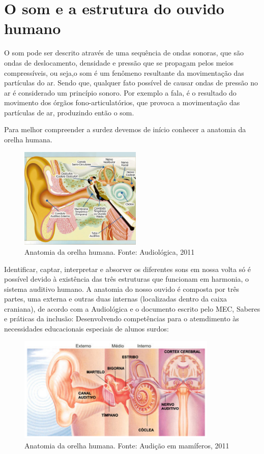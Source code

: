 \documentclass[brasil]{abnt}
\begin{document}
\chapter{O som e a estrutura do ouvido humano}
			O som pode ser descrito através de uma sequência de ondas sonoras, que são ondas de deslocamento, densidade e pressão que se propagam pelos meios compressíveis, ou seja,o som é um fenômeno resultante 
			da movimentação das partículas do ar. Sendo que, qualquer fato possível de causar ondas de pressão no ar é considerado um princípio sonoro.	Por exemplo a fala, é o resultado do movimento dos órgãos 
			fono-articulatórios, que provoca a movimentação das partículas de ar, produzindo então o som.
			
			Para melhor compreender a surdez devemos de início conhecer a anatomia da orelha humana.
				\begin{figure}[h]
					\center
					\includegraphics[width=58mm]{aa.png}
					\caption{Anatomia da orelha humana. Fonte: Audiológica, 2011}
				\end{figure}
			
			Identificar, captar, interpretar e absorver os diferentes sons em nossa volta só é possível devido à existência das três estruturas que funcionam em harmonia, o sistema auditivo humano.
			A anatomia do nosso ouvido é composta por três partes, uma externa e outras duas internas (localizadas dentro da caixa craniana), de acordo com a Audiológica e o documento escrito pelo MEC, 
			Saberes e práticas da inclusão: Desenvolvendo competências para o atemdimento às necessidades educacionais especiais de alunos surdos:
			
				\begin{figure}[!htb]
					\center
					\includegraphics[width=95mm]{aa2.png}
					\caption{Anatomia da orelha humana. Fonte: Audição em mamíferos, 2011}
				\end{figure}
				
\end{document}

